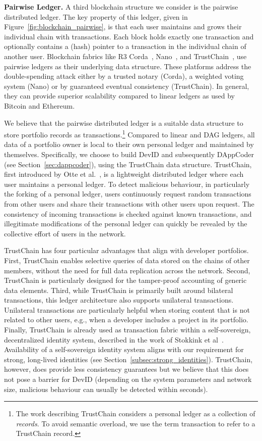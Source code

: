 \textbf{Pairwise Ledger.} A third blockchain structure we consider is the pairwise distributed ledger.
The key property of this ledger, given in Figure~\ref{fig:blockchain_pairwise}, is that each user maintains and grows their individual chain with transactions.
Each block holds exactly one transaction and optionally contains a (hash) pointer to a transaction in the individual chain of another user.
Blockchain fabrics like R3 Corda~\cite{brown2017introducing}, Nano~\cite{lemahieu2017raiblocks}, and TrustChain~\cite{otte2017trustchain}, use pairwise ledgers as their underlying data structure.
These platforms address the double-spending attack either by a trusted notary (Corda), a weighted voting system (Nano) or by guaranteed eventual consistency (TrustChain).
In general, they can provide superior scalability compared to linear ledgers as used by Bitcoin and Ethereum.

We believe that the pairwise distributed ledger is a suitable data structure to store portfolio records as transactions.\footnote{The work describing TrustChain considers a personal ledger as a collection of \emph{records}. To avoid semantic overload, we use the term transaction to refer to a TrustChain record.}
Compared to linear and DAG ledgers, all data of a portfolio owner is local to their own personal ledger and maintained by themselves.
Specifically, we choose to build DevID and subsequently DAppCoder (see Section~\ref{sec:dappcoder}), using the TrustChain data structure.
TrustChain, first introduced by Otte et al.~\cite{otte2017trustchain}, is a lightweight distributed ledger where each user maintains a personal ledger.
To detect malicious behaviour, in particularly the forking of a personal ledger, users continuously request random transactions from other users and share their transactions with other users upon request.
The consistency of incoming transactions is checked against known transactions, and illegitimate modifications of the personal ledger can quickly be revealed by the collective effort of users in the network.

TrustChain has four particular advantages that align with developer portfolios.
First, TrustChain enables selective queries of data stored on the chains of other members, without the need for full data replication across the network.
Second, TrustChain is particularly designed for the tamper-proof accounting of generic data elements.
Third, while TrustChain is primarily built around bilateral transactions, this ledger architecture also supports unilateral transactions.
Unilateral transactions are particularly helpful when storing content that is not related to other users, e.g., when a developer includes a project in its portfolio.
Finally, TrustChain is already used as transaction fabric within a self-sovereign, decentralized identity system, described in the work of Stokkink et al~\cite{stokkink2018deployment}.
Availability of a self-sovereign identity system aligns with our requirement for strong, long-lived identities (see Section~\ref{subsec:strong_identities}).
TrustChain, however, does provide less consistency guarantees but we believe that this does not pose a barrier for DevID (depending on the system parameters and network size, malicious behaviour can usually be detected within seconds).

